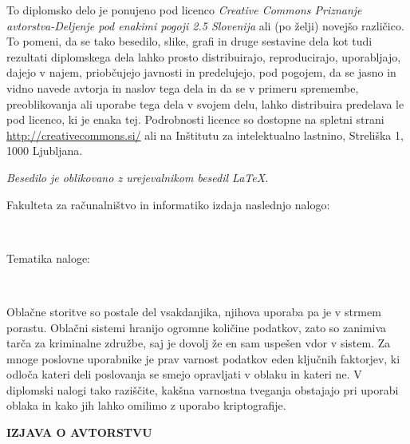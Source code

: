 \documentclass[12pt,a4paper,openany,tikz]{book}
\theoremstyle{plain}
\theoremstyle{definition}
\begin{document}
\vspace*{5cm}
{\small \noindent
To diplomsko delo je ponujeno pod licenco \textit{Creative Commons Priznanje avtorstva-Deljenje pod enakimi pogoji 2.5 Slovenija}
ali (po želji) novejšo različico.
To pomeni, da se tako besedilo, slike, grafi in druge sestavine dela kot tudi rezultati diplomskega dela lahko prosto distribuirajo,
reproducirajo, uporabljajo, dajejo v najem, priobčujejo javnosti in predelujejo, pod pogojem, da se jasno in vidno navede avtorja in naslov tega
dela in da se v primeru spremembe, preoblikovanja ali uporabe tega dela v svojem delu, lahko distribuira predelava le pod
licenco, ki je enaka tej.
Podrobnosti licence so dostopne na spletni strani \url{http://creativecommons.si/} ali na Inštitutu za
intelektualno lastnino, Streliška 1, 1000 Ljubljana.

\begin{center}%
  \hspace*{1ex}
\end{center}
}

\begin{center}
\vfill
{\em
Besedilo je oblikovano z urejevalnikom besedil \LaTeX.
}
\end{center}

\cleardoublepage

Fakulteta za računalništvo in informatiko izdaja naslednjo nalogo:

\

Tematika naloge:

\

Oblačne storitve so postale del vsakdanjika, njihova uporaba pa je v strmem porastu. Oblačni sistemi hranijo ogromne količine podatkov, zato so zanimiva tarča za kriminalne združbe, saj je dovolj že en sam uspešen vdor v sistem. Za mnoge poslovne uporabnike je prav varnost podatkov eden ključnih faktorjev, ki odloča kateri deli poslovanja se smejo opravljati v oblaku in kateri ne.
V diplomski nalogi tako raziščite, kakšna varnostna tveganja obstajajo pri uporabi oblaka in kako jih lahko omilimo z uporabo kriptografije.


\cleardoublepage

\vspace{1cm}
\begin{center}
{\Large \textbf{IZJAVA O AVTORSTVU}}
\end{center}
\end{document}
